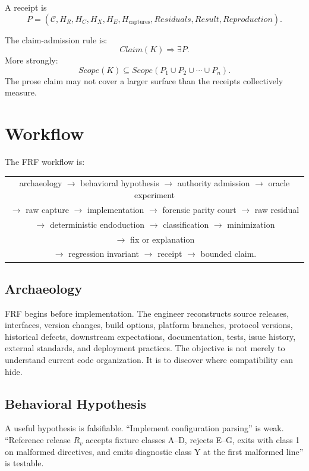 \documentclass[11pt,a4paper]{article}
\newcommand{\frf}{\textsc{FRF}}
\begin{document}
A receipt is
\[
P =
(
\mathcal{C},
H_R,
H_C,
H_X,
H_E,
H_{\text{captures}},
Residuals,
Result,
Reproduction
).
\]

The claim-admission rule is:
\[
Claim(K) \Rightarrow \exists P.
\]
More strongly:
\[
Scope(K) \subseteq Scope(P_1 \cup P_2 \cup \cdots \cup P_n).
\]
The prose claim may not cover a larger surface than the receipts collectively measure.

\section{Workflow}
\label{sec:workflow}

The \frf{} workflow is:
\begin{center}
\small
\begin{tabular}{c}
archaeology \(\rightarrow\) behavioral hypothesis \(\rightarrow\) authority admission \(\rightarrow\) oracle experiment\\
\(\rightarrow\) raw capture \(\rightarrow\) implementation \(\rightarrow\) forensic parity court \(\rightarrow\) raw residual\\
\(\rightarrow\) deterministic endoduction \(\rightarrow\) classification \(\rightarrow\) minimization\\
\(\rightarrow\) fix or explanation\\
\(\rightarrow\) regression invariant \(\rightarrow\) receipt \(\rightarrow\) bounded claim.
\end{tabular}
\end{center}

\subsection{Archaeology}
\frf{} begins before implementation. The engineer reconstructs source releases, interfaces, version changes, build options, platform branches, protocol versions, historical defects, downstream expectations, documentation, tests, issue history, external standards, and deployment practices. The objective is not merely to understand current code organization. It is to discover where compatibility can hide.

\subsection{Behavioral Hypothesis}
A useful hypothesis is falsifiable. ``Implement configuration parsing'' is weak. ``Reference release \(R_v\) accepts fixture classes A--D, rejects E--G, exits with class 1 on malformed directives, and emits diagnostic class Y at the first malformed line'' is testable.
\end{document}
